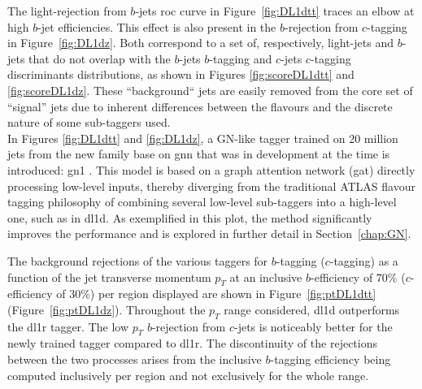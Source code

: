 The light-rejection from $b$-jets \gls{roc} curve in Figure~\ref{fig:DL1dtt} traces an elbow at high $b$-jet efficiencies. This effect is also present in the $b$-rejection from $c$-tagging in Figure~\ref{fig:DL1dz}. Both correspond to a set of, respectively, light-jets and $b$-jets that do not overlap with the $b$-jets $b$-tagging and $c$-jets $c$-tagging discriminants distributions, as shown in Figures \ref{fig:scoreDL1dtt} and \ref{fig:scoreDL1dz}. These ``background`` jets are easily removed from the core set of ``signal'' jets due to inherent differences between the flavours and the discrete nature of some sub-taggers used. \\

In Figures \ref{fig:DL1dtt} and \ref{fig:DL1dz}, a GN-like tagger trained on 20 million jets from the new family base on \gls{gnn} that was in development at the time is introduced: \gls{gn1} \cite{ATL-PHYS-PUB-2022-027}. This model is based on a graph attention network (\gls{gat}) directly processing low-level inputs, thereby diverging from the traditional ATLAS flavour tagging philosophy of combining several low-level sub-taggers into a high-level one, such as in \gls{dl1d}. As exemplified in this plot, the method significantly improves the performance and is explored in further detail in Section~\ref{chap:GN}. 

\newpage

The background rejections of the various taggers for $b$-tagging ($c$-tagging) as a function of the jet transverse momentum $p_T$ at an inclusive $b$-efficiency of 70\% ($c$-efficiency of 30\%) per region displayed are shown in Figure~\ref{fig:ptDL1dtt} (Figure~\ref{fig:ptDL1dz}). Throughout the $p_T$ range considered, \gls{dl1d} outperforms the \gls{dl1r} tagger. The low $p_T$ $b$-rejection from $c$-jets is noticeably better for the newly trained tagger compared to \gls{dl1r}. The discontinuity of the rejections between the two processes arises from the inclusive $b$-tagging efficiency being computed inclusively per region and not exclusively for the whole range.

